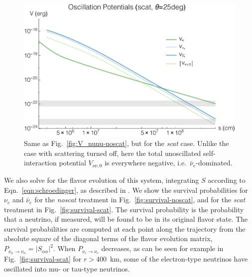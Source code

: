 \documentclass[aps,floatfix,prd,superscriptaddress,twocolumn]{revtex4-1}
\begin{document}
\begin{figure}
  \includegraphics[width=\columnwidth]{20171223-potentials-Ve_Vnue_Vnua_Vnu-000Mo-025deg-scat}
  \caption{Same as Fig.~\ref{fig:V_nunu-noscat},
    but for the \emph{scat} case.
    Unlike the case with scattering turned off,
    here the total unoscillated self-interaction potential $V_{\nu\nu,0}$
    is everywhere negative, i.e.\ $\bar{\nu}_e$-dominated.
    }
  \label{fig:V_nunu-scat}
\end{figure}

We also solve for the flavor evolution of this system,
integrating $S$ according to Eqn.~\ref{eqn:schroedinger},
as described in \cite{zhu2016-mnr_nsns_remnant}.
We show the survival probabilities for $\nu_e$ and $\bar{\nu}_e$
for the \emph{noscat} treatment in Fig.~\ref{fig:survival-noscat},
and for the \emph{scat} treatment in Fig.~\ref{fig:survival-scat}.
The survival probability is the probability that a neutrino, if measured,
will be found to be in its original flavor state.
The survival probabilities are computed at each point along the trajectory
from the absolute square of the diagonal terms of the flavor evolution matrix,
$P_{\nu_\alpha \to \nu_\alpha} = |S_{\alpha \alpha}|^2$.
When $P_{\nu_e \to \nu_e}$ decreases,
as can be seen for example in Fig.~\ref{fig:survival-scat} for $r>400$~km,
some of the electron-type neutrinos have oscillated into
mu- or tau-type neutrinos.
\end{document}
